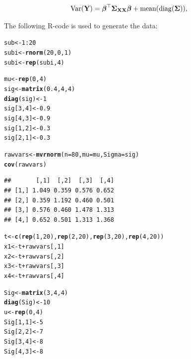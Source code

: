 \documentclass[11pt,a4paper,twoside]{book}\usepackage[]{graphicx}\usepackage[]{color}
\makeatletter
\newcommand{\hlnum}[1]{\textcolor[rgb]{0.686,0.059,0.569}{#1}}%
\newcommand{\hlopt}[1]{\textcolor[rgb]{0,0,0}{#1}}%
\newcommand{\hlstd}[1]{\textcolor[rgb]{0.345,0.345,0.345}{#1}}%
\newcommand{\hlkwb}[1]{\textcolor[rgb]{0.69,0.353,0.396}{#1}}%
\newcommand{\hlkwc}[1]{\textcolor[rgb]{0.333,0.667,0.333}{#1}}%
\newcommand{\hlkwd}[1]{\textcolor[rgb]{0.737,0.353,0.396}{\textbf{#1}}}%
\newenvironment{kframe}{%
 \def\at@end@of@kframe{}%
 \ifinner\ifhmode%
  \def\at@end@of@kframe{\end{minipage}}%
  \begin{minipage}{\columnwidth}%
 \fi\fi%
 \def\FrameCommand##1{\hskip\@totalleftmargin \hskip-\fboxsep
 \colorbox{shadecolor}{##1}\hskip-\fboxsep
     \hskip-\linewidth \hskip-\@totalleftmargin \hskip\columnwidth}%
 \MakeFramed {\advance\hsize-\width
   \@totalleftmargin\z@ \linewidth\hsize
   \@setminipage}}%
 {\par\unskip\endMakeFramed%
 \at@end@of@kframe}
\newenvironment{knitrout}{}{} %
\makeatother
\begin{document}
      \begin{align} 
        \operatorname{Var}({\mathbf{Y}}) = {\boldsymbol{\beta}}^\top {\boldsymbol{\Sigma}}{}_{{\mathbf{X}} {\mathbf{X}}}  {\boldsymbol{\beta}} + \text{mean}(\operatorname{diag}({\boldsymbol{\Sigma}}{})),
   \end{align}

The following R-code is used to generate the data:

\begin{knitrout}
\color{fgcolor}\begin{kframe}
\begin{alltt}
\hlstd{sub}\hlkwb{<-} \hlnum{1}\hlopt{:}\hlnum{20}
\hlstd{subi} \hlkwb{<-} \hlkwd{rnorm}\hlstd{(}\hlnum{20}\hlstd{,} \hlnum{0}\hlstd{,} \hlnum{1}\hlstd{)}
\hlstd{subi}\hlkwb{<-}\hlkwd{rep}\hlstd{(subi,} \hlnum{4}\hlstd{)}

\hlstd{mu} \hlkwb{<-} \hlkwd{rep}\hlstd{(}\hlnum{0}\hlstd{,}\hlnum{4}\hlstd{)}
\hlstd{sig} \hlkwb{<-} \hlkwd{matrix}\hlstd{(}\hlnum{0.4}\hlstd{,} \hlnum{4}\hlstd{,} \hlnum{4}\hlstd{)}
\hlkwd{diag}\hlstd{(sig)} \hlkwb{<-} \hlnum{1}
\hlstd{sig[}\hlnum{3}\hlstd{,}\hlnum{4}\hlstd{]} \hlkwb{<-} \hlnum{0.9}
\hlstd{sig[}\hlnum{4}\hlstd{,}\hlnum{3}\hlstd{]} \hlkwb{<-} \hlnum{0.9}
\hlstd{sig[}\hlnum{1}\hlstd{,}\hlnum{2}\hlstd{]} \hlkwb{<-} \hlnum{0.3}
\hlstd{sig[}\hlnum{2}\hlstd{,}\hlnum{1}\hlstd{]} \hlkwb{<-} \hlnum{0.3}

\hlstd{rawvars} \hlkwb{<-} \hlkwd{mvrnorm}\hlstd{(}\hlkwc{n}\hlstd{=}\hlnum{80}\hlstd{,} \hlkwc{mu}\hlstd{=mu,} \hlkwc{Sigma}\hlstd{=sig)}
\hlkwd{cov}\hlstd{(rawvars)}
\end{alltt}
\begin{verbatim}
##       [,1]  [,2]  [,3]  [,4]
## [1,] 1.049 0.359 0.576 0.652
## [2,] 0.359 1.192 0.460 0.501
## [3,] 0.576 0.460 1.478 1.313
## [4,] 0.652 0.501 1.313 1.368
\end{verbatim}
\begin{alltt}
\hlstd{t} \hlkwb{<-} \hlkwd{c}\hlstd{(}\hlkwd{rep}\hlstd{(}\hlnum{1}\hlstd{,} \hlnum{20}\hlstd{),}\hlkwd{rep}\hlstd{(}\hlnum{2}\hlstd{,}\hlnum{20}\hlstd{),} \hlkwd{rep}\hlstd{(}\hlnum{3}\hlstd{,} \hlnum{20}\hlstd{),} \hlkwd{rep}\hlstd{(}\hlnum{4}\hlstd{,} \hlnum{20}\hlstd{))}
\hlstd{x1} \hlkwb{<-} \hlstd{t}\hlopt{+}\hlstd{rawvars[,}\hlnum{1}\hlstd{]}
\hlstd{x2} \hlkwb{<-} \hlstd{t}\hlopt{+}\hlstd{rawvars[,}\hlnum{2}\hlstd{]}
\hlstd{x3} \hlkwb{<-} \hlstd{t}\hlopt{+}\hlstd{rawvars[,}\hlnum{3}\hlstd{]}
\hlstd{x4} \hlkwb{<-} \hlstd{t}\hlopt{+}\hlstd{rawvars[,}\hlnum{4}\hlstd{]}

\hlstd{Sig}\hlkwb{<-} \hlkwd{matrix}\hlstd{(}\hlnum{3}\hlstd{,} \hlnum{4}\hlstd{,}\hlnum{4}\hlstd{)}
\hlkwd{diag}\hlstd{(Sig)} \hlkwb{<-} \hlnum{10}
\hlstd{u} \hlkwb{<-} \hlkwd{rep}\hlstd{(}\hlnum{0}\hlstd{,} \hlnum{4}\hlstd{)}
\hlstd{Sig[}\hlnum{1}\hlstd{,}\hlnum{1}\hlstd{]} \hlkwb{<-} \hlnum{5}
\hlstd{Sig[}\hlnum{2}\hlstd{,}\hlnum{2}\hlstd{]} \hlkwb{<-} \hlnum{7}
\hlstd{Sig[}\hlnum{3}\hlstd{,}\hlnum{4}\hlstd{]} \hlkwb{<-} \hlnum{8}
\hlstd{Sig[}\hlnum{4}\hlstd{,}\hlnum{3}\hlstd{]} \hlkwb{<-} \hlnum{8}


\end{alltt}
\end{kframe}
\end{knitrout}
\end{document}
